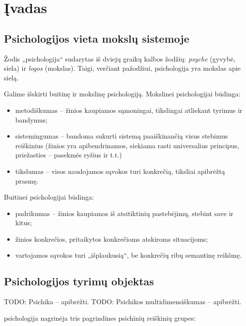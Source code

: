 \chapter{Įvadas}

\section{Psichologijos vieta mokslų sistemoje}

\label{tema:psichologijos_mokslas}

Žodis „psichologija“ sudarytas iš dviejų graikų kalbos žodžių: 
\emph{psyche} (gyvybė, siela) ir \emph{logos} (mokslas). Taigi, verčiant
pažodžiui, psichologija yra mokslas apie sielą.

Galime išskirti buitinę ir mokslinę psichologiją. Mokslinei psichologijai
būdinga:
\begin{itemize}
  \item metodiškumas – žinios kaupiamos sąmoningai, tikslingai atliekant
    tyrimus ir bandymus;
  \item sistemingumas – bandoma sukurti sistemą paaiškinančią visus 
    stebimus reiškinius (žinios yra apibendrinamos, siekiama rasti 
    universalius principus, priežasties – pasekmės ryšius ir t.t.)
  \item tikslumas – visos naudojamos sąvokos turi konkrečią, tiksliai
    apibrėžtą prasmę.
\end{itemize}
Buitinei psichologijai būdinga:
\begin{itemize}
  \item padrikumas – žinios kaupiamos iš atsitiktinių pastebėjimų, 
    stebint save ir kitus;
  \item žinios konkrečios, pritaikytos konkrečioms atskiroms situacijoms;
  \item vartojamos sąvokos turi „išplaukusią“, be konkrečių ribų 
    semantinę reikšmę.
\end{itemize}

\section{Psichologijos tyrimų objektas}

\label{tema:psichikos_samprata}

TODO: Psichika – apibrėžti.
TODO: Psichikos multidimensiškumas – apibrėžti.

\Gls{psichologija} nagrinėja tris pagrindines psichinių reiškinių grupes:

